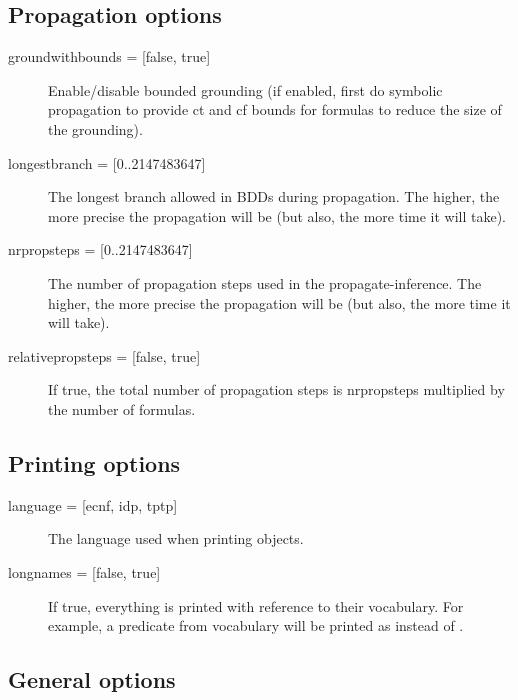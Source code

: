\subsection{Propagation options}
\begin{description}
	\item[{groundwithbounds = [false, true]}] Enable/disable bounded grounding (if enabled, first do symbolic propagation to provide ct and cf bounds for formulas to reduce the size of the grounding).
	\item[{longestbranch = [0..2147483647]}] The longest branch allowed in BDDs during propagation. The higher, the more precise the propagation will be (but also, the more time it will take).
	\item[{nrpropsteps = [0..2147483647]}] The number of propagation steps used in the propagate-inference. The higher, the more precise the propagation will be (but also, the more time it will take).
	\item[{relativepropsteps =  [false, true]}] If true, the total number of propagation steps is nrpropsteps multiplied by the number of formulas.

\end{description}

\subsection{Printing options}
\begin{description}
	\item[{language = [ecnf, idp, %
				tptp]}] The language used when printing objects. 
	\item[{longnames = [false, true]}] If true, everything is printed with reference to their vocabulary.  For example, a predicate  from vocabulary  will be printed as  instead of .
\end{description}

\subsection{General options}

